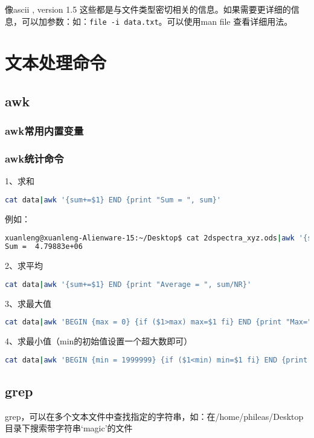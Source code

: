 像ascii , version 1.5 这些都是与文件类型密切相关的信息。如果需要更详细的信息，可以加参数：如：\verb*|file -i data.txt|。可以使用man file 查看详细用法。


\section{文本处理命令}
\subsection{awk}
\subsubsection{awk常用内置变量}


\subsubsection{awk统计命令}
1、求和
\begin{lstlisting}[language=sh]
cat data|awk '{sum+=$1} END {print "Sum = ", sum}'
\end{lstlisting}
例如：
\begin{lstlisting}[language=sh]
xuanleng@xuanleng-Alienware-15:~/Desktop$ cat 2dspectra_xyz.ods|awk '{sum+=$1} END {print "Sum = ", sum}'
Sum =  4.79883e+06
\end{lstlisting}

2、求平均
\begin{lstlisting}[language=sh]
cat data|awk '{sum+=$1} END {print "Average = ", sum/NR}'
\end{lstlisting}

3、求最大值
\begin{lstlisting}[language=sh]
cat data|awk 'BEGIN {max = 0} {if ($1>max) max=$1 fi} END {print "Max=", max}'
\end{lstlisting}

4、求最小值（min的初始值设置一个超大数即可）
\begin{lstlisting}[language=sh]
cat data|awk 'BEGIN {min = 1999999} {if ($1<min) min=$1 fi} END {print "Min=", min}'
\end{lstlisting}



\subsection{grep}
grep，可以在多个文本文件中查找指定的字符串，如：在/home/phileas/Desktop目录下搜索带字符串‘magic’的文件


